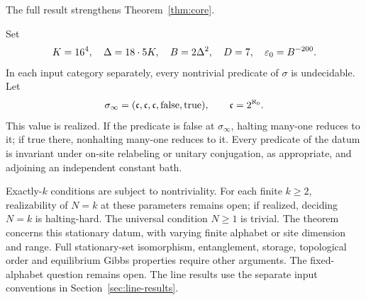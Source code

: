 The full result strengthens Theorem~\ref{thm:core}.
\begin{maintheorem}\label{thm:refined}
Set
\begin{equation}\label{eq:constants}
 K=16^4,\quad \Delta=18\cdot5K,\quad B=2\Delta^2,
 \quad D=7,\quad \varepsilon_0=B^{-200}.
\end{equation}
In each input category separately, every nontrivial predicate of $\sigma$ is undecidable. Let
\[
 \sigma_\infty=(\mathfrak c,\mathfrak c,\mathfrak c,\mathrm{false},\mathrm{true}),
 \qquad \mathfrak c=2^{\aleph_0}.
\]
This value is realized. If the predicate is false at $\sigma_\infty$, halting many-one reduces to it; if true there, nonhalting many-one reduces to it. Every predicate of the datum is invariant under on-site relabeling or unitary conjugation, as appropriate, and adjoining an independent constant bath.
\end{maintheorem}

Exactly-$k$ conditions are subject to nontriviality. For each finite $k\ge2$, realizability of $N=k$ at these parameters remains open; if realized, deciding $N=k$ is halting-hard. The universal condition $N\ge1$ is trivial. The theorem concerns this stationary datum, with varying finite alphabet or site dimension and range. Full stationary-set isomorphism, entanglement, storage, topological order and equilibrium Gibbs properties require other arguments. The fixed-alphabet question remains open. The line results use the separate input conventions in Section~\ref{sec:line-results}.

